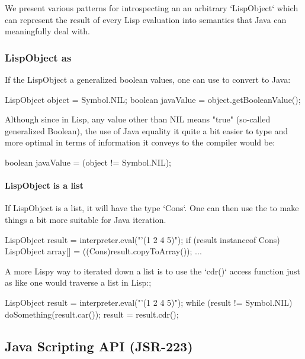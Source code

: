\documentclass[10pt]{book}
\begin{document}
We present various patterns for introspecting an an arbitrary
`LispObject` which can represent the result of every Lisp evaluation
into semantics that Java can meaningfully deal with.

\subsubsection{LispObject as }

If the LispObject a generalized boolean values, one can use
 to convert to Java:

\begin{listing-java}
     LispObject object = Symbol.NIL;
     boolean javaValue = object.getBooleanValue();
\end{listing-java}

Although since in Lisp, any value other than NIL means "true"
(so-called generalized Boolean), the use of Java equality it quite a
bit easier to type and more optimal in terms of information it conveys
to the compiler would be:

\begin{listing-java}
    boolean javaValue = (object != Symbol.NIL);
\end{listing-java}

\paragraph{LispObject is a list}

If LispObject is a list, it will have the type `Cons`.  One can then use
the  to make things a bit more suitable for Java
iteration.

\begin{listing-java}
    LispObject result = interpreter.eval("'(1 2 4 5)");
    if (result instanceof Cons) {
      LispObject array[] = ((Cons)result.copyToArray());
      ...
    }
\end{listing-java}

A more Lispy way to iterated down a list is to use the `cdr()` access
function just as like one would traverse a list in Lisp:;

\begin{listing-java}
    LispObject result = interpreter.eval("'(1 2 4 5)");
    while (result != Symbol.NIL) {
      doSomething(result.car());
      result = result.cdr();
    }
\end{listing-java}

\subsection{Java Scripting API (JSR-223)}
\end{document}
